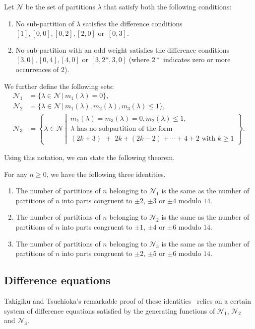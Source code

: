 \documentclass[ALCO,Unicode,published]{cedram}
\newcommand{\sN}{\mathscr{N}}
\begin{document}
Let $\sN$ be the set of partitions $\lambda$ that satisfy both the following conditions:
\begin{enumerate}
\item No sub-partition of $\lambda$ satisfies the difference conditions $[1], [0,0], [0,2], [2,0]$ or~$[0,3]$.
\item No sub-partition with an odd weight satisfies the difference conditions $[3,0], [0,4], [4,0]$ or $[3,2*,3,0]$ (where $2*$ indicates zero or more occurrences of $2$).
\end{enumerate}

We further define the following sets:
\begin{align}
\sN_1&=\{ \lambda\in \sN\,\vert\, m_1(\lambda)=0\},\\
\sN_2&=\{ \lambda\in \sN\,\vert\, m_1(\lambda), m_2(\lambda), m_3(\lambda)\leq 1\},\\
\sN_3&=\left\lbrace 
\lambda\in \sN\,\left\vert\, 
\begin{matrix}
m_1(\lambda)=m_3(\lambda)=0,  m_2(\lambda)\leq 1,\\
\lambda\,\,\mathrm{has\,\,no\,\,subpartition\,\,of\,\,the\,\,form\,\,} \\
(2k+3)\,\,+\,\,2k+(2k-2)+\cdots+4+2\,\, \mathrm{with}\,\, k\geq 1
\end{matrix}
\right.
\right\rbrace.
\end{align}

Using this notation, we can state the following theorem.
\begin{thm}
For any $n\geq 0$, we have the following three identities.
\begin{enumerate}
	\item The number of partitions of $n$ belonging to $\sN_1$ is the same as the
	number of partitions of $n$ into parts congruent to $\pm 2$, 
	$\pm 3$  or $\pm 4$ modulo $14$.
	\item The number of partitions of $n$ belonging to $\sN_2$ is the same as the
	number of partitions of $n$ into parts congruent to $\pm 1$, 
	$\pm 4$  or $\pm 6$ modulo $14$.
	\item The number of partitions of $n$ belonging to $\sN_3$ is the same as the
	number of partitions of $n$ into parts congruent to $\pm 2$, 
	$\pm 5$  or $\pm 6$ modulo $14$.
\end{enumerate}
\end{thm}

\subsection{Difference equations}
Takigiku and Tsuchioka's remarkable proof of these identities~\cite{TakTsu-nandi} relies on
a certain system of difference equations satisfied by the generating functions of $\sN_1$, $\sN_2$ and $\sN_3$.
\end{document}
